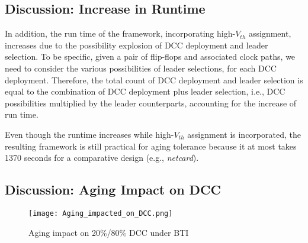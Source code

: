 

\subsection{Discussion: Increase in Runtime}
In addition, the run time of the framework, incorporating high-$V_{th}$ assignment, increases due to the possibility explosion of DCC deployment and leader selection. To be specific, given a pair of flip-flops and associated clock paths, we need to consider the various possibilities of leader selections, for each DCC deployment. Therefore, the total  count of DCC deployment and leader selection is equal to the combination of DCC deployment plus leader selection, i.e., DCC possibilities multiplied by the leader counterparts, accounting for the increase of run time. 

Even though the runtime increases while high-$V_{th}$ assignment is incorporated, the resulting framework is still practical for aging tolerance because it at most takes 1370 seconds for a comparative design (e.g., \textit{netcard}).
\subsection{Discussion: Aging Impact on DCC}
\begin{figure}
    \centering
     \texttt{[image: Aging\_impacted\_on\_DCC.png]} %
    \caption{Aging impact on 20\%/80\% DCC under BTI}
    \label{fig:exp4}
\end{figure}

